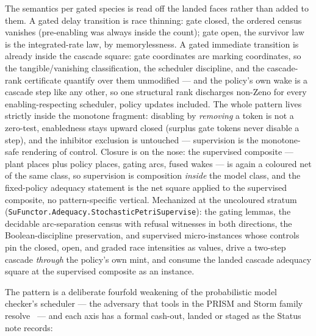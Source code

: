 The semantics per gated species is read off the landed faces rather
than added to them. A gated delay transition is race thinning: gate
closed, the ordered census vanishes (pre-enabling was always inside
the count); gate open, the survivor law is the integrated-rate law,
by memorylessness. A gated immediate transition is already inside the
cascade square: gate coordinates are marking coordinates, so the
tangible/vanishing classification, the scheduler discipline, and the
cascade-rank certificate quantify over them unmodified --- and the
policy's own wake is a cascade step like any other, so one structural
rank discharges non-Zeno for every enabling-respecting scheduler,
policy updates included. The whole pattern lives strictly inside the
monotone fragment: disabling by \emph{removing} a token is not a
zero-test, enabledness stays upward closed (surplus gate tokens never
disable a step), and the inhibitor exclusion is untouched ---
supervision is the monotone-safe rendering of control. Closure is on
the nose: the supervised composite --- plant places plus policy
places, gating arcs, fused wakes --- is again a coloured net of the
same class, so supervision is composition \emph{inside} the model
class, and the fixed-policy adequacy statement is the net square
applied to the supervised composite, no pattern-specific vertical.
Mechanized at the uncoloured stratum
(\texttt{SuFunctor.Adequacy.StochasticPetriSupervise}): the gating
lemmas, the decidable arc-separation census with refusal witnesses in
both directions, the Boolean-discipline preservation, and supervised
micro-instances whose controls pin the closed, open, and
graded race intensities as values, drive a two-step cascade
\emph{through} the policy's own mint, and consume the landed cascade
adequacy square at the supervised composite as an instance.

The pattern is a deliberate fourfold weakening of the probabilistic
model checker's scheduler --- the adversary that tools in the PRISM
and Storm family
resolve~\cite{kwiatkowska2011prism,hensel2022storm} --- and each
axis has a formal cash-out, landed or staged as the Status note
records:


